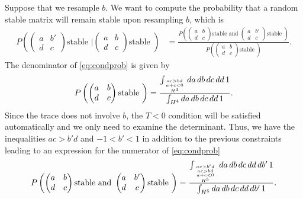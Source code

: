 \documentclass{amsart}
\theoremstyle{definition}
\theoremstyle{remark}
\numberwithin{equation}{section}
\begin{document}
Suppose that we resample $b$.  We want to compute the probability that a random stable matrix will remain stable upon resampling $b$, which is
\begin{align}\label{eq:condprob}
P\left(\begin{pmatrix}
a & b' \\
d & c
\end{pmatrix} \textrm{stable } \bigg| \begin{pmatrix}
a & b \\
d & c
\end{pmatrix} \textrm{stable } \right)
& = \frac{P\left(\begin{pmatrix}
a & b \\
d & c
\end{pmatrix} \textrm{stable and } \begin{pmatrix}
a & b' \\
d & c
\end{pmatrix} \textrm{stable } \right)}{P\left(\begin{pmatrix}
a & b \\
d & c
\end{pmatrix} \textrm{stable } \right)}.
\end{align}
The denominator of \ref{eq:condprob} is given by
\begin{align*}
P\left(\begin{pmatrix}
a & b \\
d & c
\end{pmatrix} \textrm{stable } \right) = \frac{\int_{\genfrac{}{}{0pt}{}{\genfrac{}{}{0pt}{}{ac>bd}{a+c<0}}{H^4}} da\,db\,dc\,dd\,1}{\int_{H^4} da\,db\,dc\,dd\,1}.
\end{align*}
Since the trace does not involve $b$, the $T<0$ condition will be satisfied automatically and we only need to examine the determinant. Thus, we have the inequalities $ac > b'd$ and $-1 < b' < 1$ in addition to the previous constraints leading to an expression for the numerator of \ref{eq:condprob}
\begin{align*}
P\left(\begin{pmatrix}
a & b \\
d & c
\end{pmatrix} \textrm{stable and } \begin{pmatrix}
a & b' \\
d & c
\end{pmatrix} \textrm{stable } \right) = \frac{\int_{{{ac>b'd \atop ac>bd} \atop a+c<0} \atop H^5} da\,db\,dc\,dd\,db'\,1}{\int_{H^5} da\,db\,dc\,dd\,db'\,1}.
\end{align*}
\end{document}
